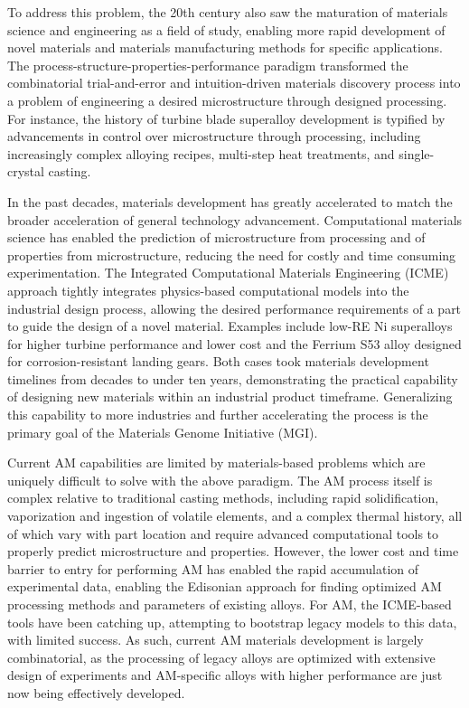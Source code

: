 To address this problem, the 20th century also saw the maturation of materials science and engineering as a field of study, enabling more rapid development of novel materials and materials manufacturing methods for specific applications. The process-structure-properties-performance paradigm transformed the combinatorial trial-and-error and intuition-driven materials discovery process into a problem of engineering a desired microstructure through designed processing. For instance, the history of turbine blade superalloy development is typified by advancements in control over microstructure through processing, including increasingly complex alloying recipes, multi-step heat treatments, and single-crystal casting. 

In the past decades, materials development has greatly accelerated to match the broader acceleration of general technology advancement. Computational materials science has enabled the prediction of microstructure from processing and of properties from microstructure, reducing the need for costly and time consuming experimentation. The Integrated Computational Materials Engineering (ICME) approach tightly integrates physics-based computational models into the industrial design process, allowing the desired performance requirements of a part to guide the design of a novel material. Examples include low-RE Ni superalloys for higher turbine performance and lower cost and the Ferrium S53 alloy designed for corrosion-resistant landing gears. Both cases took materials development timelines from decades to under ten years, demonstrating the practical capability of designing new materials within an industrial product timeframe. Generalizing this capability to more industries and further accelerating the process is the primary goal of the Materials Genome Initiative (MGI). 

Current AM capabilities are limited by materials-based problems which are uniquely difficult to solve with the above paradigm. The AM process itself is complex relative to traditional casting methods, including rapid solidification, vaporization and ingestion of volatile elements, and a complex thermal history, all of which vary with part location and require advanced computational tools to properly predict microstructure and properties. However, the lower cost and time barrier to entry for performing AM has enabled the rapid accumulation of experimental data, enabling the Edisonian approach for finding optimized AM processing methods and parameters of existing alloys. For AM, the ICME-based tools have been catching up, attempting to bootstrap legacy models to this data, with limited success. As such, current AM materials development is largely combinatorial, as the processing of legacy alloys are optimized with extensive design of experiments and AM-specific alloys with higher performance are just now being effectively developed.

